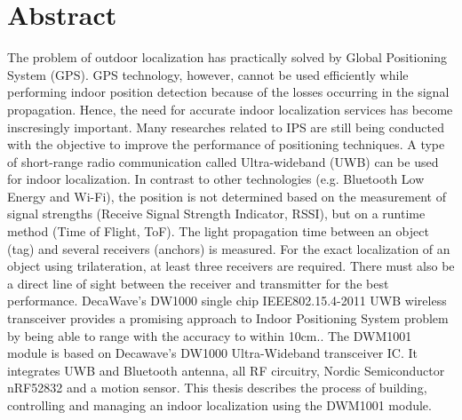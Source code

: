 \documentclass[\main/main.tex]{subfiles}
\begin{document}
\graphicspath{{imgs/}{00_misc/imgs/}}

\chapter*{Abstract}

The problem of outdoor localization has practically solved by  Global Positioning System (GPS).  GPS technology, however, cannot be used efficiently while performing indoor position detection  because of the losses occurring in the signal propagation. Hence, the need for accurate indoor localization services has become inscresingly important. Many researches related to IPS are still being conducted with the objective to improve the performance of positioning techniques. 
\newline\newline
A type of short-range radio communication called Ultra-wideband (UWB) can be used for indoor localization. In contrast to other technologies (e.g. Bluetooth Low Energy and Wi-Fi), the position is not determined based on the measurement of signal strengths (Receive Signal Strength Indicator, RSSI), but on a runtime method (Time of Flight, ToF). The light propagation time between an object (tag) and several receivers (anchors) is measured. For the exact localization of an object using trilateration, at least three receivers are required. There must also be a direct line of sight between the receiver and transmitter for the best performance.
\newline\newline
DecaWave's DW1000 single chip IEEE802.15.4-2011 UWB wireless transceiver provides a promising approach to Indoor Positioning System problem by being able to range with the accuracy to within 10cm.. The DWM1001 module is based on Decawave's DW1000 Ultra-Wideband transceiver IC. It integrates UWB and Bluetooth antenna, all RF circuitry, Nordic Semiconductor nRF52832 and a motion sensor. This thesis describes the process of building, controlling and managing an indoor localization using the DWM1001 module.
\end{document}
